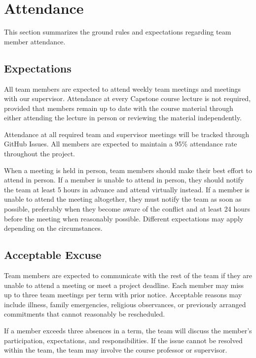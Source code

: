 \documentclass{article}
\begin{document}
\section*{Attendance}

This section summarizes the ground rules and expectations regarding team member attendance.

\subsection*{Expectations}

All team members are expected to attend weekly team meetings and meetings with our supervisor. Attendance at every Capstone course lecture is not required, provided that members remain up to date with the course material through either attending the lecture in person or reviewing the material independently.

Attendance at all required team and supervisor meetings will be tracked through GitHub Issues. All members are expected to maintain a 95\% attendance rate throughout the project.

When a meeting is held in person, team members should make their best effort to attend in person. If a member is unable to attend in person, they should notify the team at least 5 hours in advance and attend virtually instead. If a member is unable to attend the meeting altogether, they must notify the team as soon as possible, preferably when they become aware of the conflict and at least 24 hours before the meeting when reasonably possible. Different expectations may apply depending on the circumstances.

\subsection*{Acceptable Excuse}

Team members are expected to communicate with the rest of the team if they are unable to attend a meeting or meet a project deadline. Each member may miss up to three team meetings per term with prior notice. Acceptable reasons may include illness, family emergencies, religious observances, or previously arranged commitments that cannot reasonably be rescheduled.

If a member exceeds three absences in a term, the team will discuss the member's participation, expectations, and responsibilities. If the issue cannot be resolved within the team, the team may involve the course professor or supervisor.
\end{document}
